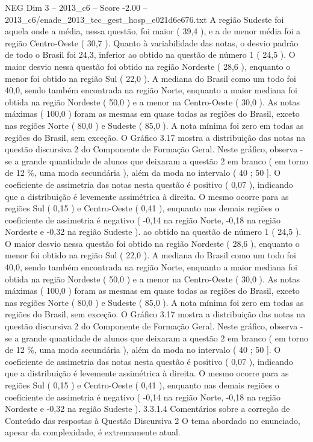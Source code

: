 \begin{textsample}{NEG Dim 3 – 2013\_c6 – Score -2.00 – 2013\_c6/enade\_2013\_tec\_gest\_hosp\_e021d6e676.txt}
A região Sudeste foi aquela onde a média, nessa questão, foi maior ( 39,4 ), e a de menor média foi a região Centro-Oeste ( 30,7 ).
Quanto à variabilidade das notas, o desvio padrão de todo o Brasil foi 24,3, inferior ao obtido na questão de número 1 ( 24,5 ).
O maior desvio nessa questão foi obtido na região Nordeste ( 28,6 ), enquanto o menor foi obtido na região Sul ( 22,0 ).
A mediana do Brasil como um todo foi 40,0, sendo também encontrada na região Norte, enquanto a maior mediana foi obtida na região Nordeste ( 50,0 ) e a menor na Centro-Oeste ( 30,0 ).
As notas máximas ( 100,0 ) foram as mesmas em quase todas as regiões do Brasil, exceto nas regiões Norte ( 80,0 ) e Sudeste ( 85,0 ).
A nota mínima foi zero em todas as regiões do Brasil, sem exceção.
O Gráfico 3.17 mostra a distribuição das notas na questão discursiva 2 do Componente de Formação Geral.
Neste gráfico, observa -se a grande quantidade de alunos que deixaram a questão 2 em branco ( em torno de 12 \%, uma moda secundária ), além da moda no intervalo ( 40 ; 50 ].
O coeficiente de assimetria das notas nesta questão é positivo ( 0,07 ), indicando que a distribuição é levemente assimétrica à direita.
O mesmo ocorre para as regiões Sul ( 0,15 ) e Centro-Oeste ( 0,41 ), enquanto nas demais regiões o coeficiente de assimetria é negativo ( -0,14 na região Norte, -0,18 na região Nordeste e -0,32 na região Sudeste ). ao obtido na questão de número 1 ( 24,5 ).
O maior desvio nessa questão foi obtido na região Nordeste ( 28,6 ), enquanto o menor foi obtido na região Sul ( 22,0 ).
A mediana do Brasil como um todo foi 40,0, sendo também encontrada na região Norte, enquanto a maior mediana foi obtida na região Nordeste ( 50,0 ) e a menor na Centro-Oeste ( 30,0 ).
As notas máximas ( 100,0 ) foram as mesmas em quase todas as regiões do Brasil, exceto nas regiões Norte ( 80,0 ) e Sudeste ( 85,0 ).
A nota mínima foi zero em todas as regiões do Brasil, sem exceção.
O Gráfico 3.17 mostra a distribuição das notas na questão discursiva 2 do Componente de Formação Geral.
Neste gráfico, observa -se a grande quantidade de alunos que deixaram a questão 2 em branco ( em torno de 12 \%, uma moda secundária ), além da moda no intervalo ( 40 ; 50 ].
O coeficiente de assimetria das notas nesta questão é positivo ( 0,07 ), indicando que a distribuição é levemente assimétrica à direita.
O mesmo ocorre para as regiões Sul ( 0,15 ) e Centro-Oeste ( 0,41 ), enquanto nas demais regiões o coeficiente de assimetria é negativo ( -0,14 na região Norte, -0,18 na região Nordeste e -0,32 na região Sudeste ). 3.3.1.4 Comentários sobre a correção de Conteúdo das respostas à Questão Discursiva 2 O tema abordado no enunciado, apesar da complexidade, é extremamente atual.

\end{textsample}
